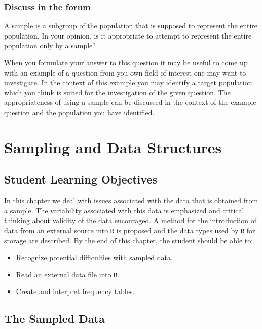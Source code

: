 \documentclass[]{krantz}
\providecommand{\tightlist}{%
  \setlength{\itemsep}{0pt}\setlength{\parskip}{0pt}}
\theoremstyle{definition}
\theoremstyle{definition}
\theoremstyle{definition}
\theoremstyle{remark}
\begin{document}
\hypertarget{discuss-in-the-forum}{%
\subsection*{Discuss in the forum}\label{discuss-in-the-forum}}


A sample is a subgroup of the population that is supposed to represent
the entire population. In your opinion, is it appropriate to attempt to
represent the entire population only by a sample?

When you formulate your answer to this question it may be useful to come
up with an example of a question from you own field of interest one may
want to investigate. In the context of this example you may identify a
target population which you think is suited for the investigation of the
given question. The appropriateness of using a sample can be discussed
in the context of the example question and the population you have
identified.

\hypertarget{ChapData}{%
\chapter{Sampling and Data Structures}\label{ChapData}}

\hypertarget{student-learning-objectives-1}{%
\section{Student Learning Objectives}\label{student-learning-objectives-1}}

In this chapter we deal with issues associated with the data that is
obtained from a sample. The variability associated with this data is
emphasized and critical thinking about validity of the data encouraged.
A method for the introduction of data from an external source into \texttt{R}
is proposed and the data types used by \texttt{R} for storage are described. By
the end of this chapter, the student should be able to:

\begin{itemize}
\tightlist
\item
  Recognize potential difficulties with sampled data.
\item
  Read an external data file into \texttt{R}.
\item
  Create and interpret frequency tables.
\end{itemize}

\hypertarget{the-sampled-data}{%
\section{The Sampled Data}\label{the-sampled-data}}
\end{document}
